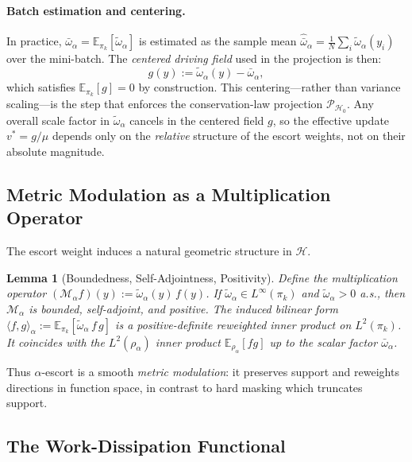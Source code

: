 \documentclass[11pt]{article}
\newtheorem{lemma}[theorem]{Lemma}
\theoremstyle{definition}
\theoremstyle{remark}
\newcommand{\E}{\mathbb{E}}
\newcommand{\pik}{\pi_k}
\begin{document}
\paragraph{Batch estimation and centering.}
In practice, $\bar{\omega}_\alpha = \E_{\pik}[\tilde{\omega}_\alpha]$ is estimated as the sample mean $\hat{\bar{\omega}}_\alpha = \frac{1}{N}\sum_i \tilde{\omega}_\alpha(y_i)$ over the mini-batch. The \emph{centered driving field} used in the projection is then:
\begin{equation}
\label{eq:centered_drive}
g(y) := \tilde{\omega}_\alpha(y) - \bar{\omega}_\alpha,
\end{equation}
which satisfies $\E_{\pik}[g] = 0$ by construction. This centering---rather than variance scaling---is the step that enforces the conservation-law projection $\mathcal{P}_{\mathcal{H}_0}$. Any overall scale factor in $\tilde{\omega}_\alpha$ cancels in the centered field $g$, so the effective update $v^* = g/\mu$ depends only on the \emph{relative} structure of the escort weights, not on their absolute magnitude.

\subsection{Metric Modulation as a Multiplication Operator}

The escort weight induces a natural geometric structure in $\mathcal{H}$.

\begin{lemma}[Boundedness, Self-Adjointness, Positivity]
\label{lem:M_props}
Define the multiplication operator $(\mathcal{M}_\alpha f)(y):=\tilde{\omega}_\alpha(y)\,f(y)$.
If $\tilde{\omega}_\alpha\in L^\infty(\pik)$ and $\tilde{\omega}_\alpha>0$ a.s., then $\mathcal{M}_\alpha$ is bounded, self-adjoint, and positive.
The induced bilinear form $\langle f,g\rangle_\alpha := \E_{\pik}[\tilde{\omega}_\alpha\,f\,g]$ is a positive-definite reweighted inner product on $L^2(\pik)$. It coincides with the $L^2(\rho_\alpha)$ inner product $\E_{\rho_\alpha}[fg]$ up to the scalar factor $\bar{\omega}_\alpha$.
\end{lemma}

Thus $\alpha$-escort is a smooth \emph{metric modulation}: it preserves support and reweights directions in function space, in contrast to hard masking which truncates support.

\subsection{The Work-Dissipation Functional}
\end{document}
